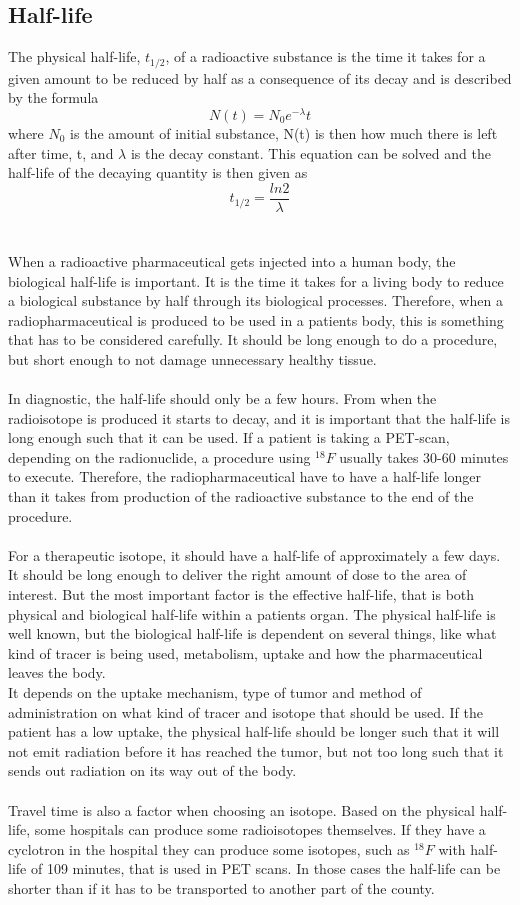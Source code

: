 \documentclass[twoside,english]{uiofysmaster/uiofysmaster}
\begin{document}
\subsection{Half-life}
The physical half-life, $t_{1/2}$, of a radioactive substance is the time it takes for a given amount to be reduced by half as a consequence of its decay and is described by the formula $$N(t) = N_0e^{-\lambda} t$$ 
where $N_0$ is the amount of initial substance, N(t) is then how much there is left after time, t, and $\lambda$ is the decay constant. This equation can be solved and the half-life of the decaying quantity is then given as $$t_{1/2} = \frac{ln2}{\lambda}$$ \\
\\
When a radioactive pharmaceutical gets injected into a human body, the biological half-life is important. It is the time it takes for a living body to reduce a biological substance by half through its biological processes. Therefore, when a radiopharmaceutical is produced to be used in a patients body, this is something that has to be considered carefully. It should be long enough to do a procedure, but short enough to not damage unnecessary healthy tissue. \\
\\
In diagnostic, the half-life should only be a few hours. From when the radioisotope is produced it starts to decay, and it is important that the half-life is long enough such that it can be used. If a patient is taking a PET-scan, depending on the radionuclide, a procedure using $^{18}F$ usually takes 30-60 minutes to execute. Therefore, the radiopharmaceutical have to have a half-life longer than it takes from production of the radioactive substance to the end of the procedure.
\\
\\
For a therapeutic isotope, it should have a half-life of approximately a few days. It should be long enough to deliver the right amount of dose to the area of interest. But the most important factor is the effective half-life, that is both physical and biological half-life within a patients organ\cite{Yeong}. The physical half-life is well known, but the biological half-life is dependent on several things, like what kind of tracer is being used, metabolism, uptake and how the pharmaceutical leaves the body\cite{Yeong}.\\
It depends on the uptake mechanism, type of tumor and method of administration\cite{Yeong} on what kind of tracer and isotope that should be used. If the patient has a low uptake, the physical half-life should be longer such that it will not emit radiation before it has reached the tumor, but not too long such that it sends out radiation on its way out of the body. 
\\
\\
Travel time is also a factor when choosing an isotope. Based on the physical half-life, some hospitals can produce some radioisotopes themselves. If they have a cyclotron in the hospital they can produce some isotopes, such as $^{18}F$ with half-life of 109 minutes, that is used in PET scans. In those cases the half-life can be shorter than if it has to be transported to another part of the county. \\
\\
\end{document}
